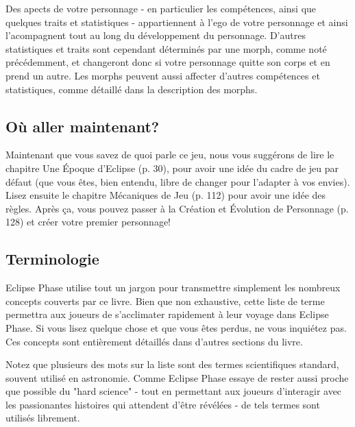 Des apects de votre personnage - en particulier les compétences, ainsi que quelques traits et statistiques - appartiennent à l'ego de votre personnage et ainsi l'acompagnent tout au long du développement du personnage. D'autres statistiques et traits sont cependant déterminés par une morph, comme noté précédemment, et changeront donc si votre personnage quitte son corps et en prend un autre. Les morphs peuvent aussi affecter d'autres compétences et statistiques, comme détaillé dans la description des morphs. 



\subsection{Où aller maintenant?} \label{sec:where-go-from} 

Maintenant que vous savez de quoi parle ce jeu, nous vous suggérons de lire le chapitre Une Époque d'Eclipse (p. 30), pour avoir une idée du cadre de jeu par défaut (que vous êtes, bien entendu, libre de changer pour  l'adapter à vos envies). Lisez ensuite le chapitre Mécaniques de Jeu (p. 112) pour avoir une idée des règles. Après ça, vous pouvez passer à la Création et Évolution de Personnage (p. 128) et créer votre premier personnage! 



\subsection{Terminologie} \label{sec:terminology} 

Eclipse Phase utilise tout un jargon pour transmettre simplement les nombreux concepts couverts par ce livre. Bien que non exhaustive, cette liste de terme permettra aux joueurs de s'acclimater rapidement à leur voyage dans Eclipse Phase. Si vous lisez quelque chose et que vous êtes perdus, ne vous inquiétez pas. Ces concepts sont entièrement détaillés dans d'autres sections du livre. 

Notez que plusieurs des mots sur la liste sont des termes scientifiques standard, souvent utilisé en astronomie. Comme Eclipse Phase essaye de rester aussi proche que possible du "hard science" - tout en permettant aux joueurs d'interagir avec les passionantes histoires qui attendent d'être révélées - de tels termes sont utilisés librement. 

